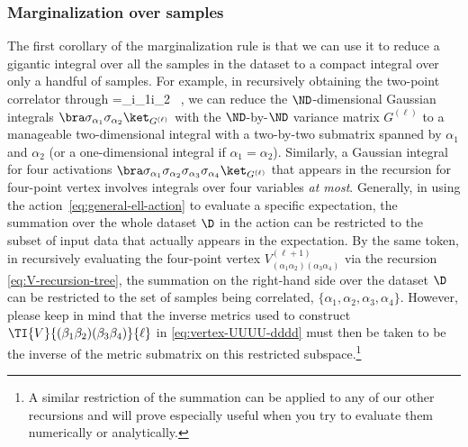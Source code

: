 \subsubsection{Marginalization over samples}
The first corollary of the marginalization rule is that we can use it to reduce a gigantic integral over all the samples in the dataset to a compact integral over only a handful of samples. For example,
in recursively obtaining the two-point correlator through
\be
{}
=\delta_{i_1i_2} \, ,
\ee
we can reduce the $\ND$-dimensional Gaussian integrals
$\bra \sigma_{\alpha_1} \sigma_{\alpha_2}\ket_{G^{(\ell)}}$ with the $\ND$-by-$\ND$ variance matrix $G^{(\ell)}$
to a manageable two-dimensional integral with a two-by-two submatrix spanned by $\alpha_1$ and $\alpha_2$ (or a one-dimensional integral if $\alpha_1=\alpha_2$). Similarly, a Gaussian integral for four activations $\bra\sigma_{\alpha_1} \sigma_{\alpha_2} \sigma_{\alpha_3} \sigma_{\alpha_4}\ket_{G^{(\ell)}}$ that appears in the recursion for four-point vertex involves integrals over four variables \emph{at most}.
Generally, in using the action~\eqref{eq:general-ell-action} to evaluate a specific expectation, the summation over the whole dataset $\D$ in the action can be restricted to the subset of input data that actually appears in the expectation.
By the same token, in recursively evaluating the four-point vertex $V^{(\ell+1)}_{(\alpha_1\alpha_2)(\alpha_3\alpha_4)}$ via the recursion \eqref{eq:V-recursion-tree}, the summation on the right-hand side over the dataset $\D$  can be restricted to the set of samples being correlated, $\{\alpha_1,\alpha_2,\alpha_3,\alpha_4\}$.
However, please keep in mind that the inverse metrics used to construct $\TI{V}{(\beta_1\beta_2)(\beta_3\beta_4)}{\ell}$ in \eqref{eq:vertex-UUUU-dddd} must then be taken to be the inverse of the metric submatrix on this restricted subspace.\footnote{A similar restriction of the summation can be applied to any of our other recursions and will prove especially useful when you try to evaluate them numerically or analytically.}



